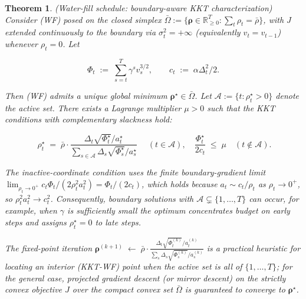 \documentclass{article}
\newtheorem{theorem}{Theorem}
\begin{document}
\begin{theorem}(Water-fill schedule: boundary-aware KKT characterization)
    \label{thm:KKT}
    Consider (WF) posed on the closed simplex $\bar\Omega := \{\boldsymbol{\rho} \in \mathbb{R}_{\ge 0}^T : \sum_t \rho_t = \bar\rho\}$, with $J$ extended continuously to the boundary via $\sigma_t^2 = +\infty$ (equivalently $v_t = v_{t-1}$) whenever $\rho_t = 0$. Let
    
    $$\Phi_t \;:=\; \sum_{s=t}^T \gamma^s v_s^{3/2}, \qquad c_t \;:=\; \alpha\Delta_t^2/2.$$
    
    Then (WF) admits a unique global minimum $\boldsymbol{\rho}^\star \in \bar\Omega$. Let $\mathcal{A} := \{t : \rho_t^\star > 0\}$ denote the active set. There exists a Lagrange multiplier $\mu > 0$ such that the KKT conditions with complementary slackness hold:

    \begin{equation}
    \boxed{\;\rho_t^\star \;=\; \bar\rho \cdot \frac{\Delta_t \sqrt{\Phi_t^\star}/a_t^\star}{\sum_{s \in \mathcal{A}} \Delta_s \sqrt{\Phi_s^\star}/a_s^\star}\;} \quad (t \in \mathcal{A}), \quad \frac{\Phi_t^\star}{2 c_t} \;\le\; \mu \quad (t \notin \mathcal{A}). \tag{KKT-WF}
    \end{equation}
    
    The inactive-coordinate condition uses the finite boundary-gradient limit $\lim_{\rho_t \to 0^+} c_t\Phi_t/(2\rho_t^2 a_t^2) = \Phi_t/(2c_t)$, which holds because $a_t \sim c_t/\rho_t$ as $\rho_t \to 0^+$, so $\rho_t^2 a_t^2 \to c_t^2$. Consequently, boundary solutions with $\mathcal{A} \subsetneq \{1,\ldots,T\}$ can occur, for example, when $\gamma$ is sufficiently small the optimum concentrates budget on early steps and assigns $\rho_t^\star = 0$ to late steps.

    The fixed-point iteration $\boldsymbol{\rho}^{(k+1)} \;\leftarrow\; \bar\rho \cdot \frac{\Delta_t \sqrt{\Phi_t^{(k)}}/a_t^{(k)}}{\sum_s \Delta_s \sqrt{\Phi_s^{(k)}}/a_s^{(k)}}$ is a practical heuristic for locating an interior (KKT-WF) point when the active set is all of $\{1,\ldots,T\}$; for the general case, projected gradient descent (or mirror descent) on the strictly convex objective $J$ over the compact convex set $\bar\Omega$ is guaranteed to converge to $\boldsymbol{\rho}^\star$.

\end{theorem}
\end{document}
